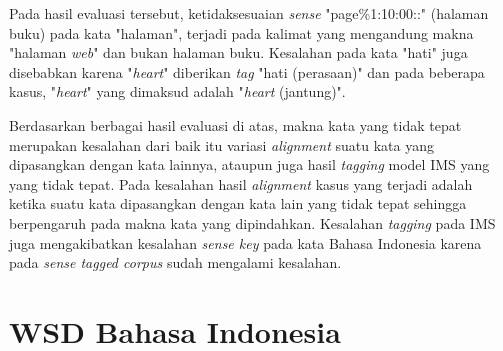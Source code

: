 Pada hasil evaluasi tersebut, ketidaksesuaian \textit{sense} "page\%1:10:00::" (halaman buku) pada kata "halaman", terjadi pada kalimat yang mengandung makna "halaman \textit{web}" dan bukan halaman buku. Kesalahan pada kata "hati" juga disebabkan karena "\textit{heart}" diberikan \textit{tag} "hati (perasaan)" dan pada beberapa kasus, "\textit{heart}" yang dimaksud adalah "\textit{heart} (jantung)".
 
Berdasarkan berbagai hasil evaluasi di atas, makna kata yang tidak tepat merupakan kesalahan dari baik itu variasi \textit{alignment} suatu kata yang dipasangkan dengan kata lainnya, ataupun juga hasil \textit{tagging} model IMS yang yang tidak tepat. Pada kesalahan hasil \textit{alignment} kasus yang terjadi adalah ketika suatu kata dipasangkan dengan kata lain yang tidak tepat sehingga berpengaruh pada makna kata yang dipindahkan. Kesalahan \textit{tagging} pada IMS juga mengakibatkan kesalahan \textit{sense key} pada kata Bahasa Indonesia karena pada \textit{sense tagged corpus} sudah mengalami kesalahan.
\section{WSD Bahasa Indonesia}

